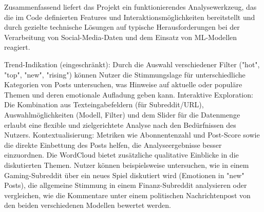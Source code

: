  
Zusammenfassend liefert das Projekt ein funktionierendes Analysewerkzeug, das die im Code definierten Features und Interaktionsmöglichkeiten bereitstellt und durch gezielte technische Lösungen auf typische Herausforderungen bei der Verarbeitung von Social-Media-Daten und dem Einsatz von ML-Modellen reagiert.


Trend-Indikation (eingeschränkt): Durch die Auswahl verschiedener Filter ("hot", "top", "new", "rising") können Nutzer die Stimmungslage für unterschiedliche Kategorien von Posts untersuchen, was Hinweise auf aktuelle oder populäre Themen und deren emotionale Aufladung geben kann.
Interaktive Exploration: Die Kombination aus Texteingabefeldern (für Subreddit/URL), Auswahlmöglichkeiten (Modell, Filter) und dem Slider für die Datenmenge erlaubt eine flexible und zielgerichtete Analyse nach den Bedürfnissen des Nutzers.
Kontextualisierung: Metriken wie Abonnentenzahl und Post-Score sowie die direkte Einbettung des Posts helfen, die Analyseergebnisse besser einzuordnen. Die WordCloud bietet zusätzliche qualitative Einblicke in die diskutierten Themen.
Nutzer können beispielsweise untersuchen, wie in einem Gaming-Subreddit über ein neues Spiel diskutiert wird (Emotionen in "new" Posts), die allgemeine Stimmung in einem Finanz-Subreddit analysieren oder vergleichen, wie die Kommentare unter einem politischen Nachrichtenpost von den beiden verschiedenen Modellen bewertet werden.